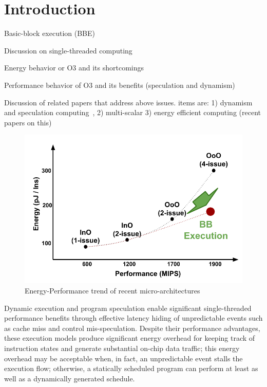 \section{Introduction} 
\label{sec:intro}
Basic-block execution (BBE)

Discussion on single-threaded computing

Energy behavior or O3 and its shortcomings

Performance behavior of O3 and its benefits (speculation and dynamism)

Discussion of related papers that address above issues. items are: 
1) dynamism and speculation computing~\cite{dyn_specul},
2) multi-scalar
3) energy efficient computing (recent papers on this)


\begin{figure}[h]
	\centering
	\includegraphics[width=1.0\columnwidth]{fig/energy_perf_insight.pdf} 
	\caption{Energy-Performance trend of recent micro-architectures}
	\label{fig:insight}
\end{figure}


% 
% 
Dynamic execution and program speculation enable significant single-threaded
performance benefits through effective latency hiding of unpredictable events
such as cache miss and control mis-speculation.  Despite their performance
advantages, these execution models produce significant energy overhead for
keeping track of instruction states and generate substantial on-chip data
traffic; this energy overhead may be acceptable when, in fact, an unpredictable
event stalls the execution flow; otherwise, a statically scheduled program can
perform at least as well as a dynamically generated schedule.

